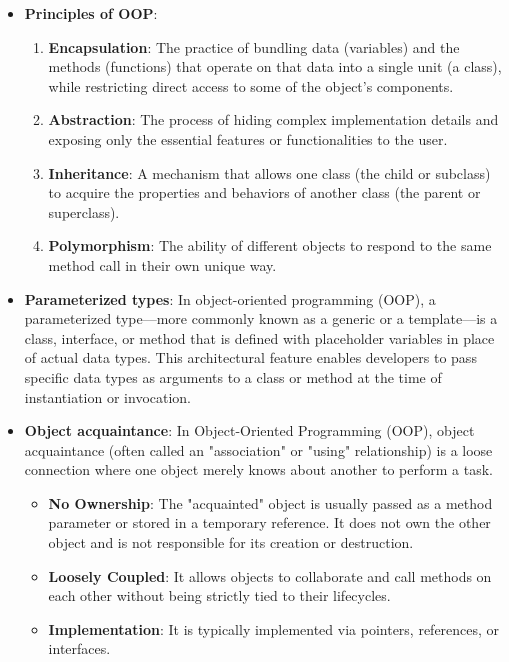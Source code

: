 \documentclass{report}
\begin{document}
    \pagebreak 
    \begin{itemize}
        \item \textbf{Principles of OOP}:
            \begin{enumerate}
                \item \textbf{Encapsulation}: The practice of bundling data (variables) and the methods (functions) that operate on that data into a single unit (a class), while restricting direct access to some of the object's components.
                \item \textbf{Abstraction}: The process of hiding complex implementation details and exposing only the essential features or functionalities to the user.
                \item \textbf{Inheritance}:  A mechanism that allows one class (the child or subclass) to acquire the properties and behaviors of another class (the parent or superclass).
                \item \textbf{Polymorphism}: The ability of different objects to respond to the same method call in their own unique way.
            \end{enumerate}
        \item \textbf{Parameterized types}: In object-oriented programming (OOP), a parameterized type—more commonly known as a generic or a template—is a class, interface, or method that is defined with placeholder variables in place of actual data types. This architectural feature enables developers to pass specific data types as arguments to a class or method at the time of instantiation or invocation. 
        \item \textbf{Object acquaintance}: In Object-Oriented Programming (OOP), object acquaintance (often called an "association" or "using" relationship) is a loose connection where one object merely knows about another to perform a task. 
            \begin{itemize}
                \item \textbf{No Ownership}: The "acquainted" object is usually passed as a method parameter or stored in a temporary reference. It does not own the other object and is not responsible for its creation or destruction.
                \item \textbf{Loosely Coupled}: It allows objects to collaborate and call methods on each other without being strictly tied to their lifecycles.
                \item \textbf{Implementation}: It is typically implemented via pointers, references, or interfaces.

\end{itemize}
\end{itemize}
\end{document}
